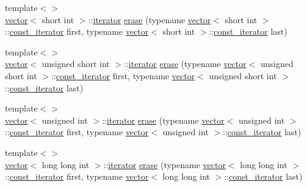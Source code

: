 \begin{DoxyCompactItemize}
\item 
{\footnotesize template$<$$>$ }\\\mbox{\hyperlink{classvector}{vector}}$<$ short int $>$\+::\mbox{\hyperlink{classvector_a35c955cacac6aacaa1e82874b1628865}{iterator}} \mbox{\hyperlink{classvector_a104682f71126f687d5905b198c093c57}{erase}} (typename \mbox{\hyperlink{classvector}{vector}}$<$ short int $>$\+::\mbox{\hyperlink{classvector_a2fc97dce62b7053449cc868607540dba}{const\+\_\+iterator}} first, typename \mbox{\hyperlink{classvector}{vector}}$<$ short int $>$\+::\mbox{\hyperlink{classvector_a2fc97dce62b7053449cc868607540dba}{const\+\_\+iterator}} last)
\item 
{\footnotesize template$<$$>$ }\\\mbox{\hyperlink{classvector}{vector}}$<$ unsigned short int $>$\+::\mbox{\hyperlink{classvector_a35c955cacac6aacaa1e82874b1628865}{iterator}} \mbox{\hyperlink{classvector_a7c1784bc0a504982dafeb7181871ae55}{erase}} (typename \mbox{\hyperlink{classvector}{vector}}$<$ unsigned short int $>$\+::\mbox{\hyperlink{classvector_a2fc97dce62b7053449cc868607540dba}{const\+\_\+iterator}} first, typename \mbox{\hyperlink{classvector}{vector}}$<$ unsigned short int $>$\+::\mbox{\hyperlink{classvector_a2fc97dce62b7053449cc868607540dba}{const\+\_\+iterator}} last)
\item 
{\footnotesize template$<$$>$ }\\\mbox{\hyperlink{classvector}{vector}}$<$ unsigned int $>$\+::\mbox{\hyperlink{classvector_a35c955cacac6aacaa1e82874b1628865}{iterator}} \mbox{\hyperlink{classvector_a79f04edca3074505dbbb8a8640db168e}{erase}} (typename \mbox{\hyperlink{classvector}{vector}}$<$ unsigned int $>$\+::\mbox{\hyperlink{classvector_a2fc97dce62b7053449cc868607540dba}{const\+\_\+iterator}} first, typename \mbox{\hyperlink{classvector}{vector}}$<$ unsigned int $>$\+::\mbox{\hyperlink{classvector_a2fc97dce62b7053449cc868607540dba}{const\+\_\+iterator}} last)
\item 
{\footnotesize template$<$$>$ }\\\mbox{\hyperlink{classvector}{vector}}$<$ long long int $>$\+::\mbox{\hyperlink{classvector_a35c955cacac6aacaa1e82874b1628865}{iterator}} \mbox{\hyperlink{classvector_a523114bde6a1401bdf01cde27ddfc2cb}{erase}} (typename \mbox{\hyperlink{classvector}{vector}}$<$ long long int $>$\+::\mbox{\hyperlink{classvector_a2fc97dce62b7053449cc868607540dba}{const\+\_\+iterator}} first, typename \mbox{\hyperlink{classvector}{vector}}$<$ long long int $>$\+::\mbox{\hyperlink{classvector_a2fc97dce62b7053449cc868607540dba}{const\+\_\+iterator}} last)

\end{DoxyCompactItemize}
